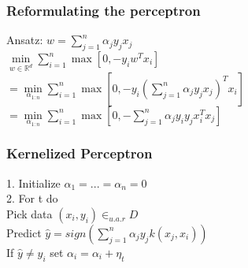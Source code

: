 	
	\subsubsection*{Reformulating the perceptron}
	Ansatz: $w=\sum_{j=1}^n \alpha_j y_j x_j$\\
	$\min \limits_{w\in\mathbb{R}^d} \sum_{i=1}^n \max [0, -y_i w^T x_i]$\\
	$= \min \limits_{\alpha_{1:n}} \sum_{i=1}^n \max [0,-y_i  ( \sum_{j=1}^n \alpha_j y_j x_j  )^T x_i ]$\\
	$= \min \limits_{\alpha_{1:n}} \sum_{i=1}^n \max  [0,- \sum_{j=1}^n \alpha_j y_i y_j x_i^T x_j ]$
			
	\subsubsection*{Kernelized Perceptron}
	1. Initialize $\alpha_1 = ... = \alpha_n = 0$\\
	2. For t do \\
	Pick data $(x_i,y_i) \in_{u.a.r} D$\\
	Predict $\hat{y} = sign(\sum_{j=1}^n \alpha_j y_j k(x_j,x_i))$\\
	If $\hat{y} \not = y_i$ set $\alpha_i = \alpha_i + \eta_t$
	
